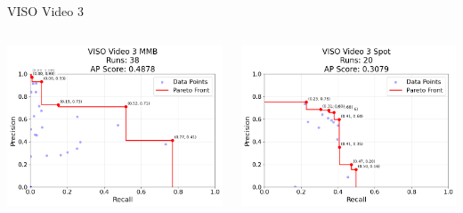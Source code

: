 \begin{frame}{VISO Video 3}
    \begin{columns}
        \begin{column}{0.48\textwidth}
            \centering
            \includegraphics[width=\textwidth,height=0.7\textheight,keepaspectratio]{images/bom/VISO_Video_3_MMB_38.png}
        \end{column}
        \begin{column}{0.48\textwidth}
            \centering
            \includegraphics[width=\textwidth,height=0.7\textheight,keepaspectratio]{images/bom/VISO_Video_3_Spot_20.png}
        \end{column}
    \end{columns}
\end{frame}

